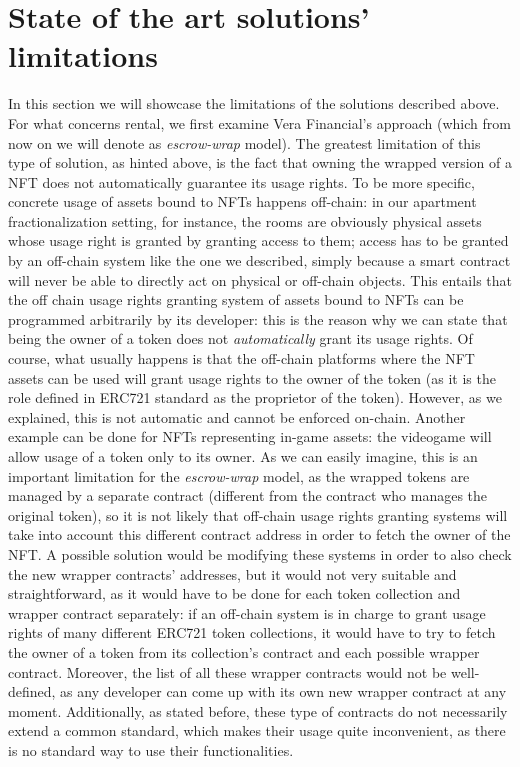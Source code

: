 \documentclass[english, LaM, oneside]{sapthesis}%
\begin{document}
\section{State of the art solutions' limitations}
\label{sec:caso}
In this section we will showcase the limitations of the solutions described above.\newline
For what concerns rental, we first examine Vera Financial's approach (which from now on we will denote as \textit{escrow-wrap} model). The greatest limitation of this type of solution, as hinted above, is the fact that owning the wrapped version of a NFT does not automatically guarantee its usage rights. To be more specific, concrete usage of assets bound to NFTs happens off-chain: in our apartment fractionalization setting, for instance, the rooms are obviously physical assets whose usage right is granted by granting access to them; access has to be granted by an off-chain system like the one we described, simply because a smart contract will never be able to directly act on physical or off-chain objects. This entails that the off chain usage rights granting system of assets bound to NFTs can be programmed arbitrarily by its developer: this is the reason why we can state that being the owner of a token does not \textit{automatically} grant its usage rights. Of course, what usually happens is that the off-chain platforms where the NFT assets can be used will grant usage rights to the owner of the token (as it is the role defined in ERC721 standard as the proprietor of the token). However, as we explained, this is not automatic and cannot be enforced on-chain.
Another example can be done for NFTs representing in-game assets: the videogame will allow usage of a token only to its owner.\newline
As we can easily imagine, this is an important limitation for the \textit{escrow-wrap} model, as the wrapped tokens are managed by a separate contract (different from the contract who manages the original token), so it is not likely that off-chain usage rights granting systems will take into account this different contract address in order to fetch the owner of the NFT. A possible solution would be modifying these systems in order to also check the new wrapper contracts' addresses, but it would not very suitable and straightforward, as it would have to be done for each token collection and wrapper contract separately: if an off-chain system is in charge to grant usage rights of many different ERC721 token collections, it would have to try to fetch the owner of a token from its collection's contract and each possible wrapper contract. Moreover, the list of all these wrapper contracts would not be well-defined, as any developer can come up with its own new wrapper contract at any moment. Additionally, as stated before, these type of contracts do not necessarily extend a common standard, which makes their usage quite inconvenient, as there is no standard way to use their functionalities. \newline
\end{document}

